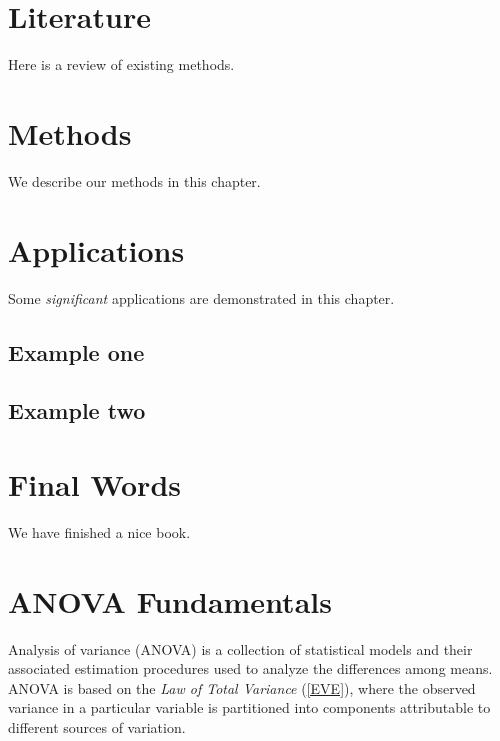 \documentclass[
]{book}
\begin{document}
\hypertarget{literature}{%
\chapter{Literature}\label{literature}}

Here is a review of existing methods.

\hypertarget{methods}{%
\chapter{Methods}\label{methods}}

We describe our methods in this chapter.

\hypertarget{applications}{%
\chapter{Applications}\label{applications}}

Some \emph{significant} applications are demonstrated in this chapter.

\hypertarget{example-one}{%
\section{Example one}\label{example-one}}

\hypertarget{example-two}{%
\section{Example two}\label{example-two}}

\hypertarget{final-words}{%
\chapter{Final Words}\label{final-words}}

We have finished a nice book.

\hypertarget{anova-fun}{%
\chapter{ANOVA Fundamentals}\label{anova-fun}}

\newcommand{\E}{\mathrm{E}}
\newcommand{\Var}{\mathrm{Var}}
\newcommand{\Cov}{\mathrm{Cov}}

Analysis of variance (ANOVA) is a collection of statistical models and their associated estimation procedures used to analyze the differences among means. ANOVA is based on the \emph{Law of Total Variance} (\ref{EVE}), where the observed variance in a particular variable is partitioned into components attributable to different sources of variation.\autocite{ANOVA}
\end{document}
